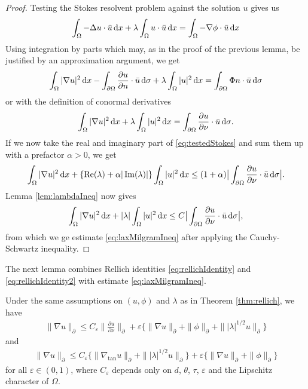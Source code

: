 \begin{proof}
  Testing the Stokes resolvent problem against the solution $u$ gives us
  \begin{align*}
    \int_\Omega -\Delta u \cdot \bar u \, {\operatorname{d}\!{x}} + \lambda \int_\Omega u \cdot \bar u \, {\operatorname{d}\!{x}}= \int_\Omega -\nabla \phi \cdot \bar u \, {\operatorname{d}\!{x}}
  \end{align*}
  Using integration by parts which may, as in the proof of the previous lemma, be justified by an approximation argument, we get
  \begin{align*}
    \int_\Omega |\nabla u|^2 \, {\operatorname{d}\!{x}} - \int_{\partial\Omega} \frac{\partial u}{\partial n} \cdot \bar u \, {\operatorname{d}\!{\sigma}} + \lambda \int_\Omega |u|^2 \, {\operatorname{d}\!{x}} = \int_{\partial\Omega}  \Phi n \cdot \bar u \, {\operatorname{d}\!{\sigma}}
  \end{align*}
  or with the definition of conormal derivatives
  \begin{align}
    \label{eq:testedStokes}
    \int_\Omega |\nabla u|^2 \, {\operatorname{d}\!{x}} + \lambda \int_\Omega |u|^2 \, {\operatorname{d}\!{x}} = \int_{\partial\Omega} \frac{\partial u}{\partial \nu} \cdot \bar u \, {\operatorname{d}\!{\sigma}}.
  \end{align}
  If we now take the real and imaginary part of \eqref{eq:testedStokes} and sum them up with a prefactor $\alpha > 0$, we get
  \begin{align*}
    \int_\Omega |\nabla u|^2 \, {\operatorname{d}\!{x}} + \{ \operatorname{Re}(\lambda) + \alpha |\operatorname{Im}(\lambda)| \} \int_\Omega |u|^2 \, {\operatorname{d}\!{x}}
    \leq (1 + \alpha) \big| \int_{\partial\Omega} \frac{\partial u}{\partial \nu} \cdot \bar u \, {\operatorname{d}\!{\sigma}} \big|.
  \end{align*}
  Lemma \ref{lem:lambdaIneq} now gives
  \begin{align*}
    \int_\Omega |\nabla u|^2 \, {\operatorname{d}\!{x}} + |\lambda| \int_\Omega |u|^2 \, {\operatorname{d}\!{x}} \leq C \big| \int_{\partial\Omega} \frac{\partial u}{\partial \nu} \cdot \bar u \, {\operatorname{d}\!{\sigma}} \big|,
  \end{align*}
  from which we ge estimate \eqref{eq:laxMilgramIneq} after applying the Cauchy-Schwartz inequality.
\end{proof}

The next lemma combines Rellich identities \eqref{eq:rellichIdentity} and \eqref{eq:rellichIdentity2} with estimate \eqref{eq:laxMilgramIneq}.

\begin{lem}
  Under the same assumptions on $(u,\phi)$ and $\lambda$ as in Theorem \ref{thm:rellich}, we have
  \begin{align}
    \label{eq:gradEstimateRellich}
    \| \nabla u\|_\partial \leq C_\varepsilon \| \frac{\partial u}{\partial \nu} \|_\partial + \varepsilon \Big\{ \|\nabla u\|_\partial + \|\phi\|_\partial + \| |\lambda|^{1/2} u\|_\partial \Big\}
  \end{align}
  and
  \begin{align}
    \label{eq:gradEstimateRellich2}
    \|\nabla u\|_\partial \leq C_\varepsilon \Big\{ \|\nabla_{\mathrm{tan}} u \|_\partial + \||\lambda|^{1/2} u\|_\partial \Big\} + \varepsilon \{ \|\nabla u\|_\partial + \|\phi\|_\partial \}
  \end{align}
  for all $\varepsilon \in (0,1)$, where $C_\varepsilon$ depends only on $d$, $\theta$, $\tau$, $\varepsilon$ and the Lipschitz character of $\Omega$.
\end{lem}

